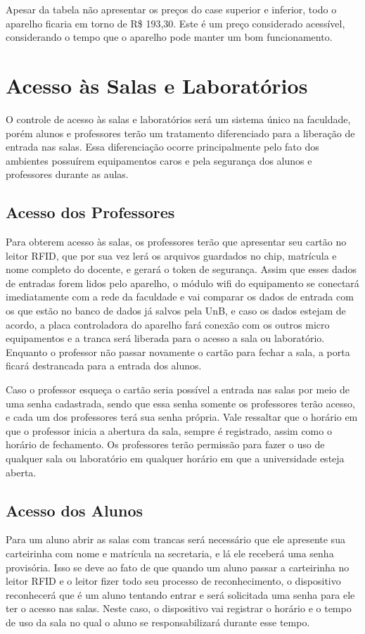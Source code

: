 Apesar da tabela não apresentar os preços do case superior e inferior, todo o aparelho ficaria em torno de R\$ 193,30. Este é um preço considerado acessível, considerando o tempo que o aparelho pode manter um bom funcionamento.

\section{Acesso às Salas e Laboratórios}
O controle de acesso às salas e laboratórios será um sistema único na faculdade, porém alunos e professores terão um tratamento diferenciado para a liberação de entrada nas salas. Essa diferenciação ocorre principalmente pelo fato dos ambientes possuírem equipamentos caros e pela segurança dos alunos e professores durante as aulas.

\subsection{Acesso dos Professores}
Para obterem acesso às salas, os professores terão que apresentar seu cartão no leitor RFID, que por sua vez lerá
 os arquivos guardados no chip, matrícula e nome completo do docente, e gerará o token de segurança. Assim que esses
  dados de entradas forem lidos pelo aparelho, o módulo wifi do equipamento se conectará imediatamente com a rede da
   faculdade e vai comparar os dados de entrada com os que estão no banco de dados já salvos pela UnB, e caso os
    dados estejam de acordo, a placa controladora do aparelho fará conexão com os outros micro equipamentos e a
     tranca será liberada para o acesso a sala ou laboratório. Enquanto o professor não passar novamente o cartão
      para fechar a sala, a porta ficará destrancada para a entrada dos alunos.

Caso o professor esqueça o cartão seria possível a entrada nas salas por meio de uma senha cadastrada, sendo que
 essa senha somente os professores terão acesso, e cada um dos professores terá sua senha própria. Vale ressaltar
  que o horário em que o professor inicia a abertura da sala, sempre é registrado, assim como o horário de fechamento.
   Os professores terão permissão para fazer o uso de qualquer sala ou laboratório em qualquer horário em que a universidade esteja aberta.

\subsection{Acesso dos Alunos}
Para um aluno abrir as salas com trancas será necessário que ele apresente sua carteirinha com nome e matrícula na secretaria, e lá ele receberá uma senha provisória. Isso se deve ao fato de que quando um aluno passar a carteirinha no leitor RFID e o leitor fizer todo seu processo de reconhecimento, o dispositivo reconhecerá que é um aluno tentando entrar e será solicitada uma senha para ele ter o acesso nas salas. Neste caso, o dispositivo vai registrar o horário e o tempo de uso da sala no qual o aluno se responsabilizará durante esse tempo.

